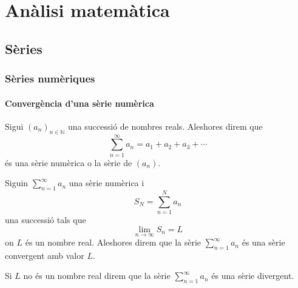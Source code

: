 \documentclass[../Apunts.tex]{subfiles}
\begin{document}
\part{Anàlisi matemàtica}
\chapter{Sèries}
\section{Sèries numèriques}
	\subsection{Convergència d'una sèrie numèrica}
	\begin{definition}
		\label{def:sèrie numèrica}
		Sigui \((a_{n})_{n\in\mathbb{N}}\) una successió de nombres reals. Aleshores direm que
		\[\sum_{n=1}^{\infty}a_{n}=a_{1}+a_{2}+a_{3}+\cdots\]
		és una sèrie numèrica o la sèrie de \((a_{n})\).
	\end{definition}
	\begin{definition}
		\label{def:sèrie convergent}
		\label{def:sèrie divergent}
		Siguin \(\sum_{n=1}^{\infty}a_{n}\) una sèrie numèrica i
		\[S_{N}=\sum_{n=1}^{N}a_{n}\]
		una successió tals que
		\[\lim_{n\to\infty}S_{n}=L\]
		on \(L\) és un nombre real. Aleshores direm que la sèrie \(\sum_{n=1}^{\infty}a_{n}\) és una sèrie convergent amb valor \(L\).
		
		Si \(L\) no és un nombre real direm que la sèrie \(\sum_{n=1}^{\infty}a_{n}\) és una sèrie divergent.
	\end{definition}
\end{document}
